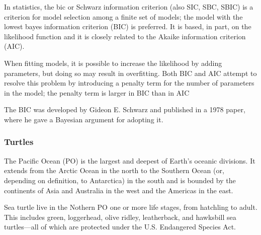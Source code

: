 \documentclass[
]{article}
\begin{document}
In statistics, the \Gls{bic} or Schwarz information criterion (also SIC,
SBC, SBIC) is a criterion for model selection among a finite set of
models; the model with the lowest bayes information criterion (BIC) is
preferred. It is based, in part, on the likelihood function and it is
closely related to the Akaike information criterion (AIC).

When fitting models, it is possible to increase the likelihood by adding
parameters, but doing so may result in overfitting. Both BIC and AIC
attempt to resolve this problem by introducing a penalty term for the
number of parameters in the model; the penalty term is larger in BIC
than in AIC

The BIC was developed by Gideon E. Schwarz and published in a 1978
paper, where he gave a Bayesian argument for adopting it.

\hypertarget{turtles}{%
\subsubsection{Turtles}\label{turtles}}

The Pacific Ocean (PO) is the largest and deepest of Earth's oceanic
divisions. It extends from the Arctic Ocean in the north to the Southern
Ocean (or, depending on definition, to Antarctica) in the south and is
bounded by the continents of Asia and Australia in the west and the
Americas in the east.

Sea turtle live in the Nothern PO one or more life stages, from
hatchling to adult. This includes green, loggerhead, olive ridley,
leatherback, and hawksbill sea turtles---all of which are protected
under the U.S. Endangered Species Act.
\end{document}
